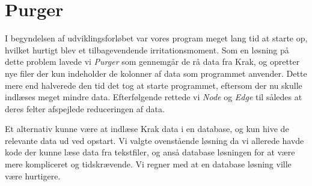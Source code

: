 \section{Purger}

I begyndelsen af udviklingsforløbet var vores program meget lang tid at starte op, hvilket hurtigt blev et tilbagevendende irritationsmoment. Som en løsning på dette problem lavede vi \emph{Purger} som gennemgår de rå data fra Krak, og opretter nye filer der kun indeholder de kolonner af data som programmet anvender. Dette mere end halverede den tid det tog at starte programmet, eftersom der nu skulle indlæses meget mindre data. Efterfølgende rettede vi \emph{Node} og \emph{Edge} til således at deres felter afspejlede reduceringen af data.

Et alternativ kunne være at indlæse Krak data i en database, og kun hive de relevante data ud ved opstart. Vi valgte ovenstående løsning da vi allerede havde kode der kunne læse data fra tekstfiler, og anså database løsningen for at være mere kompliceret og tidskrævende. Vi regner med at en database løsning ville være hurtigere.